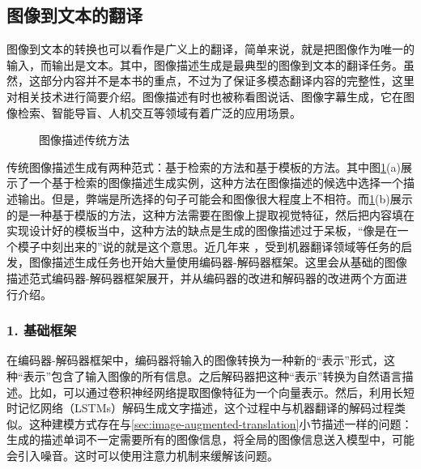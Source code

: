 \subsection{图像到文本的翻译}

\parinterval 图像到文本的转换也可以看作是广义上的翻译，简单来说，就是把图像作为唯一的输入，而输出是文本。其中，图像描述生成是最典型的图像到文本的翻译任务。虽然，这部分内容并不是本书的重点，不过为了保证多模态翻译内容的完整性，这里对相关技术进行简要介绍。图像描述有时也被称看图说话、图像字幕生成，它在图像检索、智能导盲、人机交互等领域有着广泛的应用场景。

\begin{figure}[htp]
\centering

\caption{图像描述传统方法}
\label{fig:17-15}
\end{figure}

\parinterval 传统图像描述生成有两种范式：基于检索的方法和基于模板的方法。其中图\ref{fig:17-15}(a)展示了一个基于检索的图像描述生成实例，这种方法在图像描述的候选中选择一个描述输出。但是，弊端是所选择的句子可能会和图像很大程度上不相符。而\ref{fig:17-15}(b)展示的是一种基于模版的方法，这种方法需要在图像上提取视觉特征，然后把内容填在实现设计好的模板当中，这种方法的缺点是生成的图像描述过于呆板，“像是在一个模子中刻出来的”说的就是这个意思。近几年来 ，受到机器翻译领域等任务的启发，图像描述生成任务也开始大量使用编码器-解码器框架。这里会从基础的图像描述范式编码器-解码器框架展开，并从编码器的改进和解码器的改进两个方面进行介绍。


\subsubsection{1. 基础框架}

\parinterval 在编码器-解码器框架中，编码器将输入的图像转换为一种新的“表示”形式，这种“表示”包含了输入图像的所有信息。之后解码器把这种“表示”转换为自然语言描述。比如，可以通过卷积神经网络提取图像特征为一个向量表示。然后，利用长短时记忆网络（LSTMs）解码生成文字描述，这个过程中与机器翻译的解码过程类似。这种建模方式存在与\ref{sec:image-augmented-translation}小节描述一样的问题：生成的描述单词不一定需要所有的图像信息，将全局的图像信息送入模型中，可能会引入噪音。这时可以使用注意力机制来缓解该问题。

